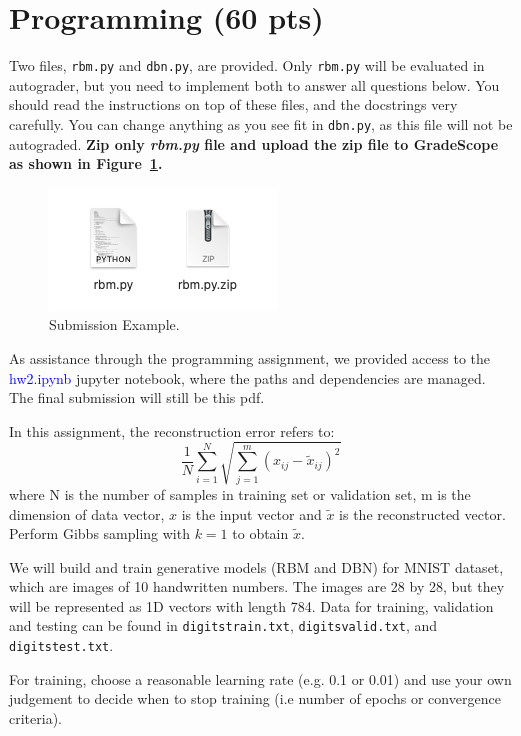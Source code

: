 \section*{Programming (60 pts)}
Two files, \texttt{rbm.py} and \texttt{dbn.py}, are provided. 
Only \texttt{rbm.py} will be evaluated in autograder, but you need to implement both to answer all questions below. 
You should read the instructions on top of these files, and the docstrings very carefully. 
You can change anything as you see fit in \texttt{dbn.py}, as this file will not be autograded. 
\textbf{Zip only \textit{rbm.py} file and upload the zip file to GradeScope as shown in Figure~\ref{fig:submission_example}.}

\begin{figure}[H]
\centering
\includegraphics[width=.35\linewidth]{images/programming_1.png}
\caption{Submission Example.} 
\label{fig:submission_example}
\end{figure}

As assistance through the programming assignment, we provided access to the \textcolor{blue}{hw2.ipynb} jupyter notebook, where the paths and dependencies are managed. The final submission will still be this pdf.

\vspace{10mm}
In this assignment, the reconstruction error refers to:
\begin{equation}
    \frac{1}{N}\sum_{i=1}^{N}\sqrt{\sum_{j=1}^{m}(x_{ij}-\tilde{x}_{ij})^{2}}
\end{equation}
where N is the number of samples in training set or validation set, m is the dimension of data vector, $x$ is the input vector and $\tilde{x}$ is the reconstructed vector. Perform Gibbs sampling with $k=1$ to obtain $\tilde{x}$. 

We will build and train generative models (RBM and DBN) for MNIST dataset, which are images of 10 handwritten numbers. The images are 28 by 28, but they will be represented as 1D vectors with length 784. Data for training, validation and testing can be found in \texttt{digitstrain.txt}, \texttt{digitsvalid.txt}, and \texttt{digitstest.txt}.

For training, choose a reasonable learning rate (e.g. 0.1 or 0.01) and use your own judgement to decide when to stop training (i.e number of epochs or convergence criteria). 


